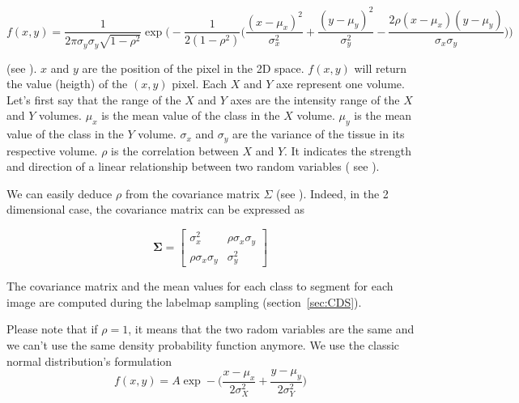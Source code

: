 \begin{equation}\label{GDDDPGDGS}
f(x,y)=\frac{1}{2 \pi \sigma_y \sigma_y \sqrt{1-\rho^2}} \operatorname*{exp}\Big ( -\frac{1}{2(1-\rho^2)}\Big( \frac{(x-\mu_x)^2}{\sigma_x^2} + \frac{(y-\mu_y)^2}{\sigma_y^2} - \frac{2\rho(x-\mu_x)(y-\mu_y)}{\sigma_x \sigma_y}\Big)\Big)   
\end{equation}

(see \cite{15}). $x$ and $y$ are the position of the pixel in the 2D space. $f(x,y)$ will return the value (heigth) of the $(x,y)$ pixel. Each $X$ and  $Y$ axe represent one volume. Let's first say that the range of the $X$ and $Y$ axes are the intensity range of the $X$ and $Y$ volumes. $\mu_x$ is the mean value of the class in the $X$ volume. $\mu_y$ is the mean value of the class in the $Y$ volume. $\sigma_x$ and  $\sigma_y$ are the variance of the tissue in its respective volume. $\rho$ is the correlation between $X$ and $Y$. It indicates the strength and direction of a linear relationship between two random variables ( see \cite{16}). 


\par
We can easily deduce $\rho$ from the covariance matrix $\Sigma$ (see \cite{17}). Indeed, in the 2 dimensional case, the covariance matrix can be expressed as

\begin{equation*}
\mathbf{\Sigma} = 
 \begin{bmatrix}
   \sigma_x^2 & \rho \sigma_x \sigma_y \\
   \rho \sigma_x \sigma_y & \sigma_y^2
 \end{bmatrix}
\end{equation*}

The covariance matrix and the mean values for each class to segment for each image are computed during the labelmap sampling (section~\ref{sec:CDS}). 
\par
Please note that if $\rho = 1$, it means that the two radom variables are the same and we can't use the same density probability function anymore. We use the classic normal distribution's formulation
\begin{equation}\label{GDPGDGS}
f(x,y)=A\operatorname*{exp}-\Big ( \frac{x-\mu_x}{2\sigma_X^2} + \frac{y-\mu_y}{2\sigma_Y^2}\Big)   
\end{equation}

